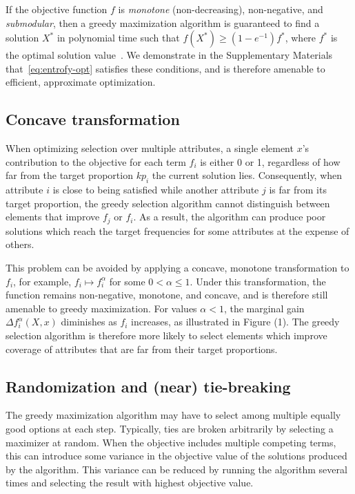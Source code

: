 \documentclass[12pt]{article}
\begin{document}
If the objective function $f$ is \emph{monotone} (non-decreasing), non-negative, and \emph{submodular}, then a greedy maximization algorithm is guaranteed to find a solution $X^*$ in polynomial time such that $f(X^*) \geq (1 - e^{-1}) f^*$, where $f^*$ is the optimal solution value~\cite{fujishige2005submodular}.
We demonstrate in the Supplementary Materials
that~\eqref{eq:entrofy-opt} satisfies these conditions, and is therefore amenable to efficient, approximate optimization.

\subsection*{Concave transformation}
When optimizing selection over multiple attributes, a single element $x$'s contribution to the objective for each term $f_i$ is either 0 or 1, regardless of how far from the target proportion $kp_i$ the current solution lies.
Consequently, when attribute $i$ is close to being satisfied while another attribute $j$ is far from its target proportion, the greedy selection algorithm cannot distinguish between elements that improve $f_j$ or $f_i$.
As a result, the algorithm can produce poor solutions which reach the target frequencies for some attributes at the expense of others.

This problem can be avoided by applying a concave, monotone transformation to $f_i$, for example, $f_i \mapsto f_i^\alpha$ for some ${0 < \alpha \leq 1}$.
Under this transformation, the function remains non-negative, monotone, and concave, and is therefore still amenable to greedy maximization.
For values $\alpha < 1$, the marginal gain $\Delta f_i^\alpha(X, x)$ diminishes as $f_i$ increases, as illustrated in Figure (1).
The greedy selection algorithm is therefore more likely to select elements which improve coverage of attributes that are far from their target proportions.

\subsection*{Randomization and (near) tie-breaking}

The greedy maximization algorithm may have to select among multiple equally good options at each step.
Typically, ties are broken arbitrarily by selecting a maximizer at random.
When the objective includes multiple competing terms, this can introduce some variance in the objective value of the solutions produced by the algorithm.
This variance can be reduced by running the algorithm several times and selecting the result with highest objective value.
\end{document}
